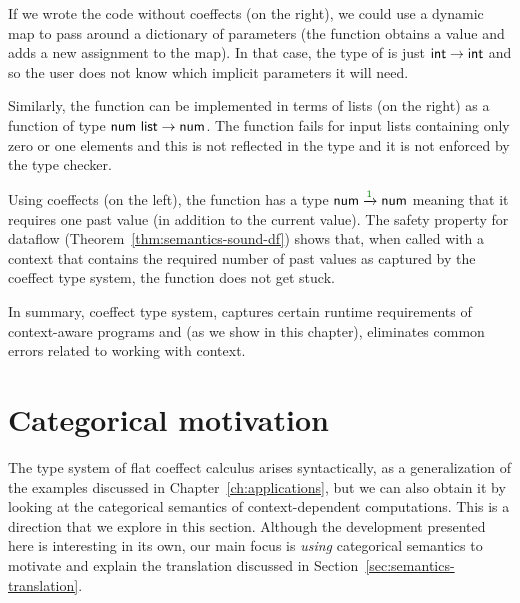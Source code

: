 If we wrote the code without coeffects (on the right), we could use a dynamic map to pass around
a dictionary of parameters (the  function obtains a value and  adds a new
assignment to the map). In that case, the type of  is just $\textnormal{\sffamily int}\rightarrow\textnormal{\sffamily int}$
and so the user does not know which implicit parameters it will need. 

Similarly, the  function can be implemented in terms of lists (on the right) as
a function of type $\textnormal{\sffamily num}~\textnormal{\sffamily list}\rightarrow\textnormal{\sffamily num}$. The function fails for input 
lists containing only zero or one elements and this is not reflected in the type and it is not 
enforced by the type checker.

Using coeffects (on the left), the function has a type $\ident{num}\xrightarrow{\cclrd{1}}\ident{num}$ 
meaning that it requires one past value (in addition to the current value). The safety property
for dataflow (Theorem~\ref{thm:semantics-sound-df}) shows that, when called with a context that
contains the required number of past values as captured by the coeffect type system, the function 
does not get stuck.

In summary, coeffect type system, captures certain runtime 
requirements of context-aware programs and (as we show in this chapter), eliminates common errors 
related to working with context.



%                
%

\section{Categorical motivation}
\label{sec:semantics-theory}

The type system of flat coeffect calculus arises syntactically, as a generalization of the examples 
discussed in Chapter~\ref{ch:applications}, but we can also obtain it by looking at the categorical 
semantics of context-dependent computations. This is a direction that we explore in this section. 
Although the development presented here is interesting in its own, our main focus is \emph{using} 
categorical semantics to motivate and explain the translation discussed in 
Section~\ref{sec:semantics-translation}.

